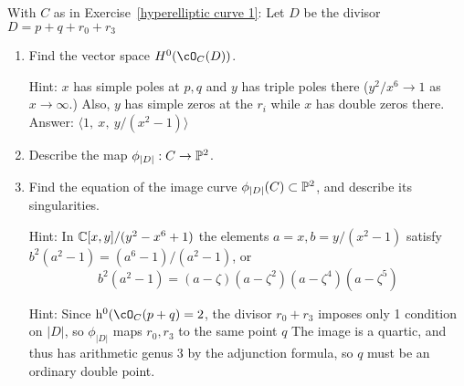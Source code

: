 \begin{exercise}
With $C$ as in Exercise~\ref{hyperelliptic curve 1}:
Let $D$ be the divisor $D = p + q + r_0 + r_3$
\begin{enumerate}
\item Find the vector space $H^0(\cO_C(D))$. 

Hint: $x$ has simple poles at $p,q$ and $y$ has triple poles there ($y^2/x^6 \to 1$ as $x\to \infty$.)
Also, $y$ has simple zeros at the $r_i$ while $x$ has double zeros there.  Answer: $\langle 1,\ x,\ y/(x^2-1)\rangle$
\item Describe the map $\phi_{|D|} : C \to \PP^2$. 
\item Find the equation of the image curve $\phi_{|D|}(C) \subset \PP^2$, and describe its singularities.

Hint: In $\CC[x,y]/(y^2-x^6+1)$ the elements $ a = x, b = y/(x^2-1)$ satisfy $b^2(a^2-1)=(a^6-1)/(a^2-1)$,
or 
$$b^2(a^2-1) = (a-\zeta)(a-\zeta^2)(a-\zeta^4)(a-\zeta^5)$$

Hint: 
Since $\h^0(\cO_C(p+q) = 2$, the divisor $r_0+r_3$ imposes only 1 condition on $|D|$, so $\phi_{|D|}$ maps $r_0,r_3$ to the same
point $q$
The image is a quartic, and thus has arithmetic genus 3 by the adjunction formula, so $q$ must be
an ordinary double point.
\end{enumerate}
\end{exercise}


